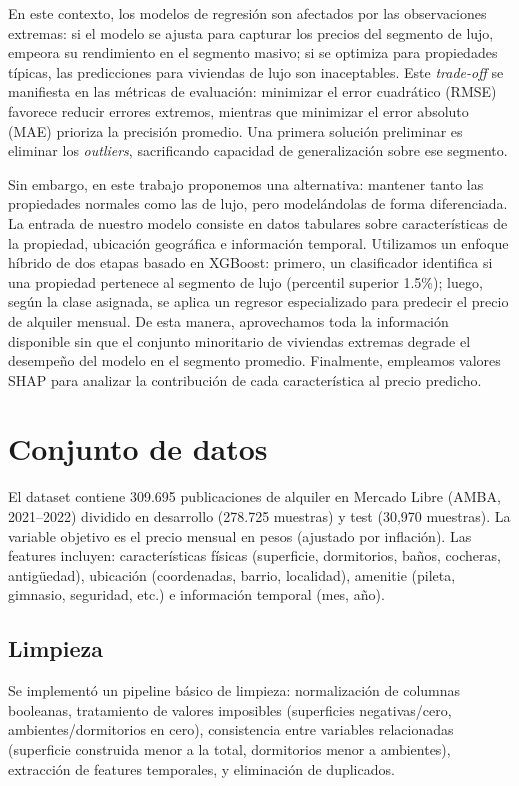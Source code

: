 \documentclass[conference]{IEEEtran}
\begin{document}
    En este contexto, los modelos de regresión son afectados por las observaciones extremas: si el modelo se ajusta para capturar los precios del segmento de lujo, empeora su rendimiento en el segmento masivo; si se optimiza para propiedades típicas, las predicciones para viviendas de lujo son inaceptables. Este \emph{trade-off} se manifiesta en las métricas de evaluación: minimizar el error cuadrático (RMSE) favorece reducir errores extremos, mientras que minimizar el error absoluto (MAE) prioriza la precisión promedio. Una primera solución preliminar es eliminar los \emph{outliers}, sacrificando capacidad de generalización sobre ese segmento.

    Sin embargo, en este trabajo proponemos una alternativa: mantener tanto las propiedades normales como las de lujo, pero modelándolas de forma diferenciada. La entrada de nuestro modelo consiste en datos tabulares sobre características de la propiedad, ubicación geográfica  e información temporal. Utilizamos un enfoque híbrido de dos etapas basado en XGBoost: primero, un clasificador identifica si una propiedad pertenece al segmento de lujo (percentil superior 1.5\%); luego, según la clase asignada, se aplica un regresor especializado para predecir el precio de alquiler mensual. De esta manera, aprovechamos toda la información disponible sin que el conjunto minoritario de viviendas extremas degrade el desempeño del modelo en el segmento promedio. Finalmente, empleamos valores SHAP para analizar la contribución de cada característica al precio predicho.


    \section{Conjunto de datos}
    El dataset contiene 309.695 publicaciones de alquiler en Mercado Libre (AMBA, 2021--2022) dividido en desarrollo (278.725 muestras) y test (30,970 muestras). La variable objetivo es el precio mensual en pesos (ajustado por inflación). Las features incluyen: características físicas (superficie, dormitorios, baños, cocheras, antigüedad), ubicación (coordenadas, barrio, localidad), amenitie (pileta, gimnasio, seguridad, etc.) e información temporal (mes, año).

    \subsection{Limpieza}
    Se implementó un pipeline básico de limpieza: normalización de columnas booleanas, tratamiento de valores imposibles (superficies negativas/cero, ambientes/dormitorios en cero), consistencia entre variables relacionadas (superficie construida menor a la total, dormitorios menor a ambientes), extracción de features temporales, y eliminación de duplicados.
\end{document}
